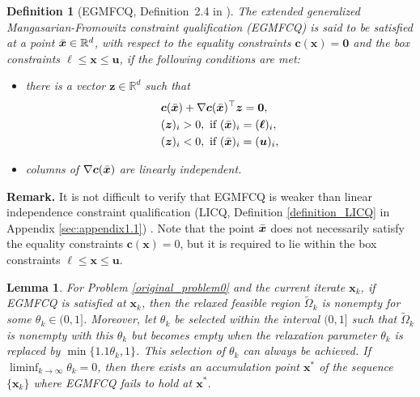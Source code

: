 \documentclass[aos]{imsart}
\numberwithin{equation}{section}
\theoremstyle{plain}
\newtheorem{definition}{Definition}
\newtheorem{lemma}{Lemma}
\begin{document}
\begin{definition}
    [EGMFCQ, Definition~2.4 in \cite{xu2015smoothing}] 
    \label{def_MFCQ}
    The extended generalized Mangasarian-Fromowitz constraint qualification (EGMFCQ) is said to be satisfied at a point $\Bar{\bm{x}} \in \mathbb{R}^{d}$, with respect to the equality constraints $\bm{c}(\bm{x}) = \bm{0}$ and the box constraints $\bm{\ell} \leq \bm{x} \leq \bm{u}$, if the following conditions are met:
    \begin{itemize}
        \item there is a vector $\bm{z} \in \mathbb{R}^{d}$ such that
        \begin{equation}
        \label{MFCQ_z}
            \begin{split}
                & \bm{c}(\Bar{\bm{x}}) + \nabla \bm{c}(\Bar{\bm{x}})^{\top} \bm{z} = \bm{0}, \\
                & (\bm{z})_i >0,~\text{if}~(\Bar{\bm{x}})_{i} = (\bm{\ell})_i,\\
                & (\bm{z})_i < 0,~\text{if}~(\Bar{\bm{x}})_{i} = (\bm{u})_i,
            \end{split}
        \end{equation}

        \item columns of $\nabla \bm{c}(\Bar{\bm{x}})$ are linearly independent. 
    \end{itemize}
\end{definition}

\textbf{Remark.} It is not difficult to verify that EGMFCQ is weaker than linear independence constraint qualification (LICQ, Definition \ref{definition_LICQ} in Appendix \ref{sec:appendix1.1}) \cite[Definition~12.4]{jorge2006numerical}. 
Note that the point $\Bar{\bm{x}}$ does not necessarily satisfy the equality constraints $\bm{c}(\bm{x}) = 0$, but it is required to lie within the box constraints $\bm{\ell} \leq \bm{x} \leq \bm{u}$. 




\begin{lemma}
\label{prop_thetak_to_0}
    For Problem \eqref{original_problem0} and the current iterate $\bm{x}_k$, if EGMFCQ is satisfied at $\bm{x}_k$, then the relaxed feasible region $\widetilde{\Omega}_k$ is nonempty for some $\theta_k \in (0,1]$. Moreover, let $\theta_k$ be selected within the interval $(0,1]$ such that $\widetilde{\Omega}_k$ is nonempty with this $\theta_k$ but becomes empty when the relaxation parameter $\theta_k$ is replaced by $\min\{1.1\theta_k,1\}$. This selection of $\theta_k$ can always be achieved. If $\mathop{\lim \inf}_{k \to \infty} \theta_k = 0$, then there exists an accumulation point $\bm{x}^{*}$ of the sequence $\{\bm{x}_k\}$ where EGMFCQ fails to hold at $\bm{x}^{*}$.
\end{lemma}
\end{document}
